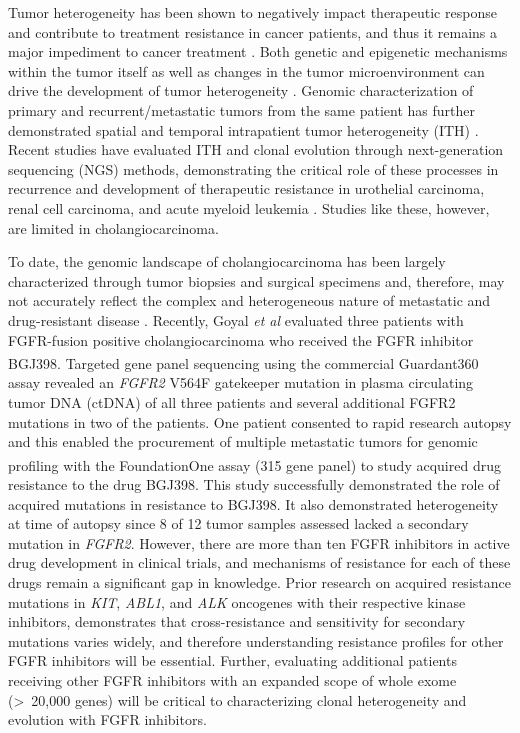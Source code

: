 Tumor heterogeneity has been shown to negatively impact therapeutic response and contribute to treatment resistance in cancer patients, and thus it remains a major impediment to cancer treatment \cite{bedard2013,burrell2014,dexter1986,fisher2013,heppner1989}. Both genetic and epigenetic mechanisms within the tumor itself as well as changes in the tumor microenvironment can drive the development of tumor heterogeneity \cite{heng2009,junttila2013,meacham2013}. Genomic characterization of primary and recurrent/metastatic tumors from the same patient has further demonstrated spatial and temporal intrapatient tumor heterogeneity (ITH) \cite{bedard2013}. Recent studies have evaluated ITH and clonal evolution through next-generation sequencing (NGS) methods, demonstrating the critical role of these processes in recurrence and development of therapeutic resistance in urothelial carcinoma, renal cell carcinoma, and acute myeloid leukemia \cite{ding2012,faltas2016,gerlinger2012,gerlinger2014}. Studies like these, however, are limited in cholangiocarcinoma.

To date, the genomic landscape of cholangiocarcinoma has been largely characterized through tumor biopsies and surgical specimens and, therefore, may not accurately reflect the complex and heterogeneous nature of metastatic and drug-resistant disease \cite{farshidfar2017,jusakul2017,ruzzenente2016,zou2014}. Recently, Goyal \textit{et al} \cite{goyal2017} evaluated three patients with FGFR-fusion positive cholangiocarcinoma who received the FGFR inhibitor BGJ398. Targeted gene panel sequencing using the commercial Guardant360\textsuperscript\textregistered{} assay revealed an \textit{FGFR2} V564F gatekeeper mutation in plasma circulating tumor DNA (ctDNA) of all three patients and several additional FGFR2 mutations in two of the patients. One patient consented to rapid research autopsy and this enabled the procurement of multiple metastatic tumors for genomic profiling with the FoundationOne\textsuperscript\textregistered{} assay (315 gene panel) to study acquired drug resistance to the drug BGJ398. This study successfully demonstrated the role of acquired mutations in resistance to BGJ398. It also demonstrated heterogeneity at time of autopsy since 8 of 12 tumor samples assessed lacked a secondary mutation in \textit{FGFR2}. However, there are more than ten FGFR inhibitors in active drug development in clinical trials, and mechanisms of resistance for each of these drugs remain a significant gap in knowledge. Prior research on acquired resistance mutations in \textit{KIT}, \textit{ABL1}, and \textit{ALK} oncogenes with their respective kinase inhibitors, demonstrates that cross-resistance and sensitivity for secondary mutations varies widely, and therefore understanding resistance profiles for other FGFR inhibitors will be essential. Further, evaluating additional patients receiving other FGFR inhibitors with an expanded scope of whole exome (\textgreater{}~20,000 genes) will be critical to characterizing clonal heterogeneity and evolution with FGFR inhibitors.

